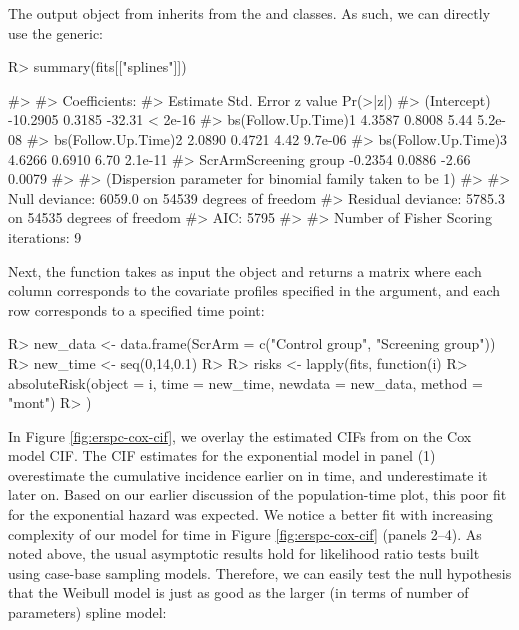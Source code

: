 \documentclass[
]{jss}
\begin{document}
The output object from  inherits from the
 and  classes. As such, we can directly
use the  generic:

\begin{CodeChunk}

\begin{CodeInput}
R> summary(fits[["splines"]]) 
\end{CodeInput}
\end{CodeChunk}

\begin{CodeChunk}

\begin{CodeOutput}
#> 
#> Coefficients:
#>                       Estimate Std. Error z value Pr(>|z|)
#> (Intercept)           -10.2905     0.3185  -32.31  < 2e-16
#> bs(Follow.Up.Time)1     4.3587     0.8008    5.44  5.2e-08
#> bs(Follow.Up.Time)2     2.0890     0.4721    4.42  9.7e-06
#> bs(Follow.Up.Time)3     4.6266     0.6910    6.70  2.1e-11
#> ScrArmScreening group  -0.2354     0.0886   -2.66   0.0079
#> 
#> (Dispersion parameter for binomial family taken to be 1)
#> 
#>     Null deviance: 6059.0  on 54539  degrees of freedom
#> Residual deviance: 5785.3  on 54535  degrees of freedom
#> AIC: 5795
#> 
#> Number of Fisher Scoring iterations: 9
\end{CodeOutput}
\end{CodeChunk}

Next, the  function takes as input the
 object and returns a matrix where each column
corresponds to the covariate profiles specified in the 
argument, and each row corresponds to a specified time point:

\begin{CodeChunk}

\begin{CodeInput}
R> new_data <- data.frame(ScrArm = c("Control group", "Screening group"))
R> new_time <- seq(0,14,0.1)
R> 
R> risks <- lapply(fits, function(i) {
R>   absoluteRisk(object = i, time = new_time, newdata = new_data, method = "mont")
R> })
\end{CodeInput}
\end{CodeChunk}

In Figure \ref{fig:erspc-cox-cif}, we overlay the estimated CIFs from
 on the Cox model CIF. The CIF estimates for the
exponential model in panel (1) overestimate the cumulative incidence
earlier on in time, and underestimate it later on. Based on our earlier
discussion of the population-time plot, this poor fit for the
exponential hazard was expected. We notice a better fit with increasing
complexity of our model for time in Figure \ref{fig:erspc-cox-cif}
(panels 2--4). As noted above, the usual asymptotic results hold for
likelihood ratio tests built using case-base sampling models. Therefore,
we can easily test the null hypothesis that the Weibull model is just as
good as the larger (in terms of number of parameters) spline model:
\end{document}
